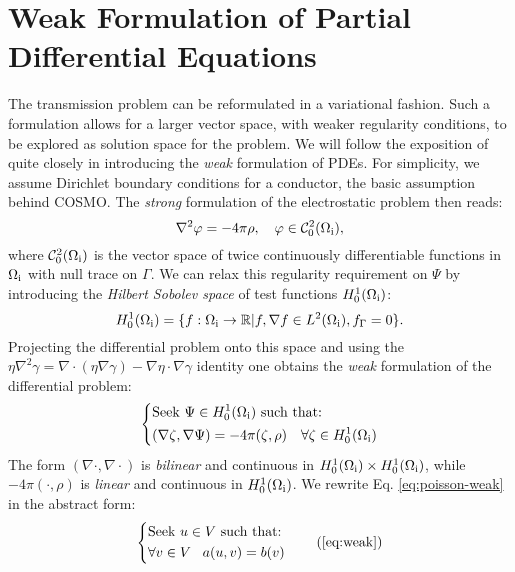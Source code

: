 \section{Weak Formulation of Partial Differential Equations}\label{sec:weak}

The transmission problem can be reformulated in a variational fashion.
Such a formulation allows for a larger vector space, with weaker regularity
conditions, to be explored as solution space for the problem.
We will follow the exposition of \citeauthor{Ern2004-oo} quite closely
in introducing the \emph{weak} formulation of \glspl{PDE}.
For simplicity, we assume Dirichlet boundary conditions for a conductor,
\ie the basic assumption behind \acrshort{COSMO}.
The \emph{strong} formulation of the electrostatic problem then reads:
\begin{equation}\label{eq:poisson-cosmo}
  \nabla^2\varphi = -4\pi\rho,
  \quad \varphi \in \mathcal{C}^2_0(\Omega_\mathrm{i}),
\end{equation}
where $\mathcal{C}^2_0(\Omega_\mathrm{i})$ is the vector space of twice
continuously differentiable functions in $\Omega_\mathrm{i}$ with null trace on
$\Gamma$.
We can relax this regularity requirement on $\Psi$ by introducing the
\emph{Hilbert Sobolev space} of test functions $H_0^1(\Omega_\mathrm{i})$:
\begin{equation}
  H_0^1(\Omega_\mathrm{i}) = \lbrace
  f : \Omega_\mathrm{i} \rightarrow \mathbb{R}
  | f, \nabla f \in L^2(\Omega_\mathrm{i}), f_\Gamma = 0
  \rbrace.
\end{equation}
Projecting the differential problem onto this space and using the
$\eta\nabla^2\gamma = \nabla\cdot(\eta\nabla\gamma) - \nabla\eta\cdot\nabla\gamma$ identity
one obtains the \emph{weak} formulation of the differential problem:
\begin{equation}\label{eq:poisson-weak}
  \left\{
  \begin{aligned}
    &\text{Seek $\Psi \in H_0^1(\Omega_\mathrm{i})$ such that:}\\
    &(\nabla\zeta, \nabla\Psi) =
    -4\pi(\zeta, \rho) \quad
    \forall \zeta\in H_0^1(\Omega_\mathrm{i})
  \end{aligned}
  \right.
\end{equation}
The form $(\nabla\cdot, \nabla\cdot)$ is \emph{bilinear} and continuous
in $H_0^1(\Omega_\mathrm{i})\times H_0^1(\Omega_\mathrm{i})$, while $-4\pi(\cdot, \rho)$ is
\emph{linear} and continuous in $H_0^1(\Omega_\mathrm{i})$.
We rewrite Eq. \eqref{eq:poisson-weak} in the abstract form:
\begin{equation}
  \left\{
  \begin{aligned}
    &\text{Seek $u \in V$ such that:}\\
    &\forall v \in V \,\,\,\,\,
    a(u, v) = b(v)
  \end{aligned}
  \right.
  \tag{\ref{eq:weak}}
\end{equation}
